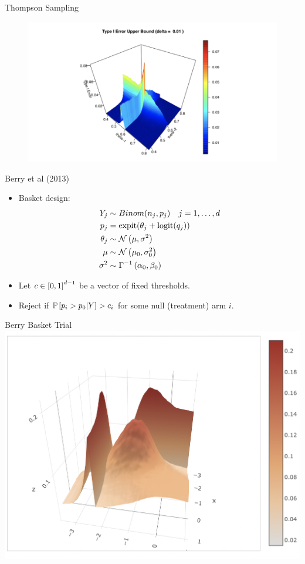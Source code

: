 \begin{frame}{Thompson Sampling}
\begin{figure}
    \centering
    \includegraphics[width=\textwidth]{figures/thompson-sampling.png}
\end{figure}
\end{frame}

\begin{frame}{Berry et al (2013)}
\begin{itemize}
    \item Basket design:
        \begin{align*}
            Y_j &\sim Binom(n_j, p_j) \quad j=1,\ldots, d \\
            p_j &= \operatorname{expit}(\theta_j + \operatorname{logit}(q_j)) \\
            \theta_j &\sim \mathcal{N}\left( \mu, \sigma^2 \right) \\
            \mu &\sim \mathcal{N}\left( \mu_0, \sigma_0^2 \right) \\
            \sigma^2 &\sim \Gamma^{-1}\left( \alpha_0, \beta_0 \right)
        \end{align*}
    \item Let $c \in \left[0,1\right]^{d-1}$ be a vector of fixed thresholds.
    \item Reject if $\mathbb{P}\left[p_i > p_0 | Y\right] > c_i$ for some null (treatment) arm $i$.
\end{itemize}
\end{frame}

\begin{frame}{Berry Basket Trial}
\centering
\includegraphics[width=\textwidth]{figures/berry.png}
\end{frame}
